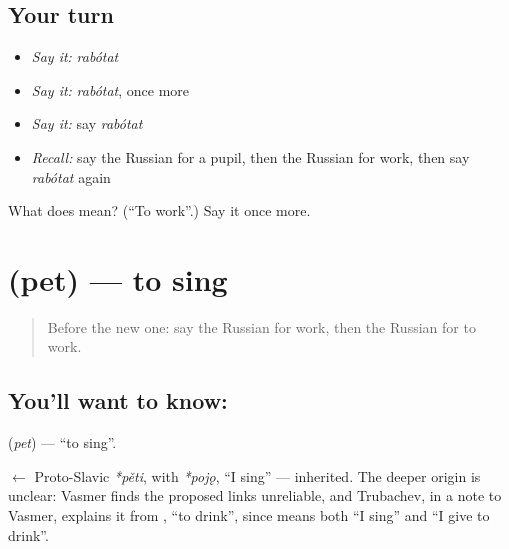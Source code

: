 \subsection*{Your turn}
\begin{itemize}
\raggedright
  \item \emph{Say it:} \emph{rabótat}
  \item \emph{Say it:} \emph{rabótat}, once more
  \item \emph{Say it:} say \emph{rabótat}
  \item \emph{Recall:} say the Russian for a pupil, then the Russian for work, then say \emph{rabótat} again
\end{itemize}

\begin{tcolorbox}[breakable,colback=teal!4,colframe=teal!35!black,title={Before you move on}]
What does  mean? (\textquotedblleft{}To work\textquotedblright{}.) Say it once more.
\end{tcolorbox}
\section[\texorpdfstring{\ru{петь} (pet)}{петь (pet)}]{ (pet) — to sing}

\label{lesson:RU-C38-pet}



\begin{quote}
Before the new one: say the Russian for work, then the Russian for to work.
\end{quote}

\subsection*{You'll want to know: }
\textbf{} (\emph{pet}) — \textquotedblleft{}to sing\textquotedblright{}.

\begin{cousinweb}
\textbf{} $\leftarrow$ Proto-Slavic \emph{*pěti}, with \emph{*pojǫ}, \textquotedblleft{}I sing\textquotedblright{} — inherited. The deeper origin is unclear: Vasmer finds the proposed links unreliable, and Trubachev, in a note to Vasmer, explains it from \emph{}, \textquotedblleft{}to drink\textquotedblright{}, since \emph{} means both \textquotedblleft{}I sing\textquotedblright{} and \textquotedblleft{}I give to drink\textquotedblright{}.
\end{cousinweb}

